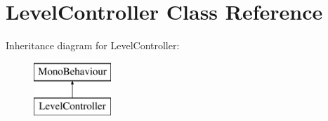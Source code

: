 \hypertarget{class_level_controller}{}\section{Level\+Controller Class Reference}
\label{class_level_controller}
Inheritance diagram for Level\+Controller\+:\begin{figure}[H]
\begin{center}
\leavevmode
\includegraphics[height=2.000000cm]{class_level_controller}
\end{center}
\end{figure}
